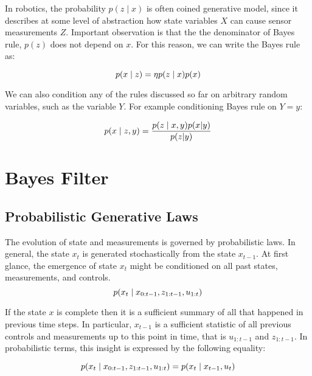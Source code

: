\documentclass[14pt,letterpaper]{article}
\theoremstyle{definition}
\begin{document}
\newpage
In robotics, the probability $p(z \mid x)$ is often coined generative model, since it describes at some level of abstraction how state variables $X$ can cause sensor measurements $Z$.
Important observation is that the the denominator of Bayes rule, $p(z)$ does not depend on $x$. For this reason, we can write the Bayes rule as:

\begin{equation}
  p(x \mid z) = \eta p(z \mid x)p(x) \\
  \label{eq:Bayes Rule with normalization factor}
\end{equation}

We can also condition any of the rules discussed so far on arbitrary random variables, such as the variable $Y$. For example conditioning Bayes rule on $Y=y$:

\begin{equation}
  p(x \mid z, y) = \frac{p(z \mid x,y)p(x | y)}{p(z | y)} \\
\end{equation}

\newpage

\section{Bayes Filter}

\subsection{Probabilistic Generative Laws}

The evolution of state and measurements is governed by probabilistic laws.
In general, the state $x_t$ is generated stochastically from the state $x_{t-1}$.
At first glance, the emergence of state $x_t$ might be conditioned on all past states, measurements, and controls.
\begin{equation}
  p(x_t \mid x_{0:t-1}, z_{1:t-1}, u_{1:t}) \\
  \label{eq:State probabilibility distribution}
\end{equation}

If the state $x$ is complete then it is a sufficient summary of all that happened in previous time steps.
In particular, $x_{t-1}$ is a sufficient statistic of all previous controls and measurements up to this point in time, that is $u_{1:t-1}$ and $z_{1:t-1}$.
In probabilistic terms, this insight is expressed by the following equality:

\begin{equation}
  p(x_t \mid x_{0:t-1}, z_{1:t-1}, u_{1:t}) = p(x_t \mid x_{t-1}, u_t) \\
\end{equation}
\end{document}
